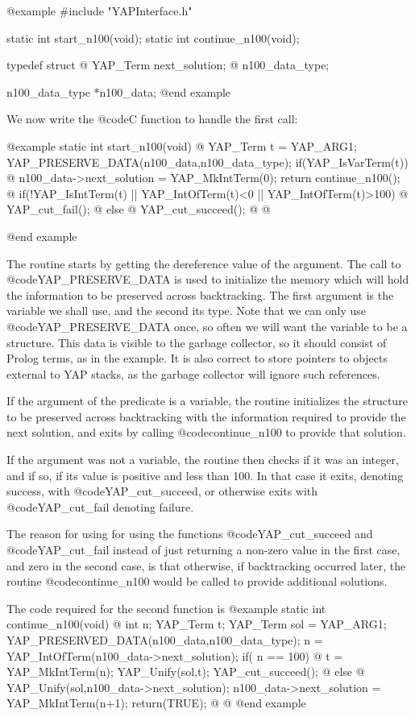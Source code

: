 @example
#include "YAPInterface.h"

static int start_n100(void);
static int continue_n100(void);

typedef struct @{
    YAP_Term next_solution; 
   @} n100_data_type;

n100_data_type *n100_data;
@end example

We now write the @code{C} function to handle the first call:

@example
static int start_n100(void)
@{
      YAP_Term t = YAP_ARG1;
      YAP_PRESERVE_DATA(n100_data,n100_data_type);
      if(YAP_IsVarTerm(t)) @{
          n100_data->next_solution = YAP_MkIntTerm(0);
          return continue_n100();
       @}
      if(!YAP_IsIntTerm(t) || YAP_IntOfTerm(t)<0 || YAP_IntOfTerm(t)>100) @{
          YAP_cut_fail();
      @} else @{
          YAP_cut_succeed();
      @}
@}

@end example

The routine starts by getting the dereference value of the argument.
The call to @code{YAP_PRESERVE_DATA} is used to initialize the memory
which will hold the information to be preserved across
backtracking. The first argument is the variable we shall use, and the
second its type. Note that we can only use @code{YAP_PRESERVE_DATA}
once, so often we will want the variable to be a structure. This data
is visible to the garbage collector, so it should consist of Prolog
terms, as in the example. It is also correct to store pointers to
objects external to YAP stacks, as the garbage collector will ignore
such references.

If the argument of the predicate is a variable, the routine initializes the 
structure to be preserved across backtracking with the information
required to provide the next solution, and exits by calling
@code{continue_n100} to provide that solution.

If the argument was not a variable, the routine then checks if it was an
integer, and if so, if its value is positive and less than 100. In that
case it exits, denoting success, with @code{YAP_cut_succeed}, or
otherwise exits with @code{YAP_cut_fail} denoting failure.

The reason for using for using the functions @code{YAP_cut_succeed} and
@code{YAP_cut_fail} instead of just returning a non-zero value in the
first case, and zero in the second case, is that otherwise, if
backtracking occurred later, the routine @code{continue_n100} would be
called to provide additional solutions.

The code required for the second function is
@example
static int continue_n100(void)
@{
      int n;
      YAP_Term t;
      YAP_Term sol = YAP_ARG1;
      YAP_PRESERVED_DATA(n100_data,n100_data_type);
      n = YAP_IntOfTerm(n100_data->next_solution);
      if( n == 100) @{
           t = YAP_MkIntTerm(n);
           YAP_Unify(sol,t);
           YAP_cut_succeed();
        @}
       else @{
           YAP_Unify(sol,n100_data->next_solution);
           n100_data->next_solution = YAP_MkIntTerm(n+1);
           return(TRUE);
        @}
@}
@end example

